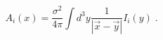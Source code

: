 \begin{equation}
A_{i}(x)=\frac{\sigma ^{2}}{4\pi }\int d^{3}y\frac{1}{|\overrightarrow{x}-%
\overrightarrow{y}|}I_{i}(y)\;.  \label{sp}
\end{equation}

